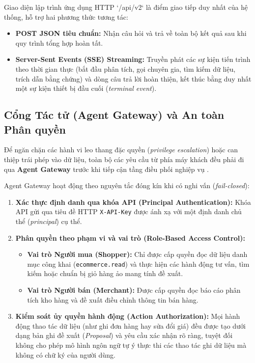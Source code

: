 Giao diện lập trình ứng dụng HTTP `/api/v2` là điểm giao tiếp duy nhất của hệ thống, hỗ trợ hai phương thức tương tác:
\begin{itemize}
    \item \textbf{POST JSON tiêu chuẩn:} Nhận câu hỏi và trả về toàn bộ kết quả sau khi quy trình tổng hợp hoàn tất.
    \item \textbf{Server-Sent Events (SSE) Streaming:} Truyền phát các sự kiện tiến trình theo thời gian thực (bắt đầu phân tích, gọi chuyên gia, tìm kiếm dữ liệu, trích dẫn bằng chứng) và dòng câu trả lời hoàn thiện, kết thúc bằng duy nhất một sự kiện thiết bị đầu cuối (\textit{terminal event}).
\end{itemize}

\subsection{Cổng Tác tử (Agent Gateway) và An toàn Phân quyền}
Để ngăn chặn các hành vi leo thang đặc quyền (\textit{privilege escalation}) hoặc can thiệp trái phép vào dữ liệu, toàn bộ các yêu cầu từ phía máy khách đều phải đi qua \textbf{Agent Gateway} trước khi tiếp cận tầng điều phối nghiệp vụ .

Agent Gateway hoạt động theo nguyên tắc đóng kín khi có nghi vấn (\textit{fail-closed}):
\begin{enumerate}
    \item \textbf{Xác thực định danh qua khóa API (Principal Authentication):} Khóa API gửi qua tiêu đề HTTP \texttt{X-API-Key} được ánh xạ với một định danh chủ thể (\textit{principal}) cụ thể.
    \item \textbf{Phân quyền theo phạm vi và vai trò (Role-Based Access Control):}
    \begin{itemize}
        \item \textbf{Vai trò Người mua (Shopper):} Chỉ được cấp quyền đọc dữ liệu danh mục công khai (\texttt{ecommerce.read}) và thực hiện các hành động tư vấn, tìm kiếm hoặc chuẩn bị giỏ hàng ảo mang tính đề xuất.
        \item \textbf{Vai trò Người bán (Merchant):} Được cấp quyền đọc báo cáo phân tích kho hàng và đề xuất điều chỉnh thông tin bán hàng.
    \end{itemize}
    \item \textbf{Kiểm soát ủy quyền hành động (Action Authorization):} Mọi hành động thao tác dữ liệu (như ghi đơn hàng hay sửa đổi giá) đều được tạo dưới dạng bản ghi đề xuất (\textit{Proposal}) và yêu cầu xác nhận rõ ràng, tuyệt đối không cho phép mô hình ngôn ngữ tự ý thực thi các thao tác ghi dữ liệu mà không có chữ ký của người dùng.
\end{enumerate}

